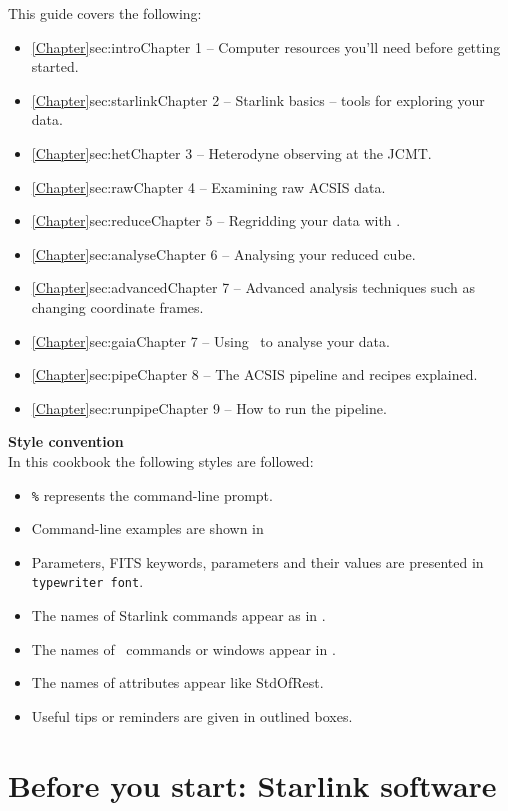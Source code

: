 \documentclass[11pt,oneside,chapters]{starlink}
\providecommand{\att}[1]{\textsf{#1}}
\begin{document}
This guide covers the following:
\begin{itemize}
\itemsep0em
\item \cref{Chapter}{sec:intro}{Chapter 1} -- Computer resources you'll need before getting started.
\item \cref{Chapter}{sec:starlink}{Chapter 2} -- Starlink basics -- tools for exploring your data.
\item \cref{Chapter}{sec:het}{Chapter 3}  -- Heterodyne observing at the JCMT.
\item \cref{Chapter}{sec:raw}{Chapter 4}  -- Examining raw ACSIS data.
\item \cref{Chapter}{sec:reduce}{Chapter 5}  -- Regridding your data with \makecube.
\item \cref{Chapter}{sec:analyse}{Chapter 6}  -- Analysing your reduced cube.
\item \cref{Chapter}{sec:advanced}{Chapter 7}  -- Advanced analysis techniques such as changing coordinate frames.
\item \cref{Chapter}{sec:gaia}{Chapter 7}  -- Using \gaia\ to analyse your data.
\item \cref{Chapter}{sec:pipe}{Chapter 8}  -- The ACSIS pipeline and recipes explained.
\item \cref{Chapter}{sec:runpipe}{Chapter 9}  -- How to run the pipeline.
\end{itemize}

\textbf{Style convention}\\
In this cookbook the following styles are followed:
\begin{itemize}[noitemsep,nolistsep]
\item \texttt{\%} represents the command-line prompt.
\item Command-line examples are shown in \texttt{\color{MidnightBlue}{navy typewriter font.}}
\item Parameters, FITS keywords, parameters and their values are presented in \texttt{typewriter font}.
\item The names of Starlink commands appear as in .
\item The names of \gaia\ commands or windows appear in .
\item The names of attributes appear like \att{StdOfRest}.
\item Useful tips or reminders are given in outlined boxes.
\end{itemize}

\section{Before you start: Starlink software}
\end{document}
